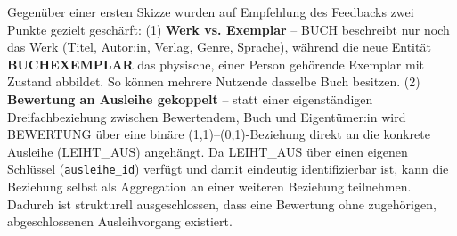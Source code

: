 \documentclass[11pt,a4paper]{article}
\begin{document}
Gegenüber einer ersten Skizze wurden auf Empfehlung des Feedbacks zwei Punkte gezielt geschärft: (1) \textbf{Werk vs. Exemplar} -- BUCH beschreibt nur noch das Werk (Titel, Autor:in, Verlag, Genre, Sprache), während die neue Entität \textbf{BUCHEXEMPLAR} das physische, einer Person gehörende Exemplar mit Zustand abbildet. So können mehrere Nutzende dasselbe Buch besitzen. (2) \textbf{Bewertung an Ausleihe gekoppelt} -- statt einer eigenständigen Dreifachbeziehung zwischen Bewertendem, Buch und Eigentümer:in wird BEWERTUNG über eine binäre (1,1)--(0,1)-Beziehung direkt an die konkrete Ausleihe (LEIHT\_AUS) angehängt. Da LEIHT\_AUS über einen eigenen Schlüssel (\texttt{ausleihe\_id}) verfügt und damit eindeutig identifizierbar ist, kann die Beziehung selbst als Aggregation an einer weiteren Beziehung teilnehmen. Dadurch ist strukturell ausgeschlossen, dass eine Bewertung ohne zugehörigen, abgeschlossenen Ausleihvorgang existiert.
\end{document}

